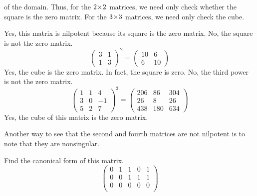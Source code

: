 \begin{exercises}
\begin{answer}
      of the domain.
      Thus, for the $2 \! \times \! 2$ matrices, 
      we need only check whether the square is the zero matrix.
      For the $3 \! \times \! 3$ matrices, we need only check the cube.
      \begin{exparts}
        \partsitem Yes, this matrix is nilpotent because
          its square is the zero matrix.
        \partsitem No, the square is not the zero matrix.
          \begin{equation*}
            \begin{pmatrix}
               3  &1  \\
               1  &3
            \end{pmatrix}^2
            =\begin{pmatrix}
               10  &6  \\
               6   &10
            \end{pmatrix}
          \end{equation*}
        \partsitem Yes, the cube is the zero matrix.
          In fact, the square is zero.
        \partsitem No, the third power is not the zero matrix.
          \begin{equation*}
            \begin{pmatrix}
              1  &1  &4  \\
              3  &0  &-1 \\
              5  &2  &7
            \end{pmatrix}^3
            =\begin{pmatrix}
              206  &86  &304  \\
               26  &8   &26   \\
              438  &180 &634
            \end{pmatrix}
          \end{equation*}
        \partsitem Yes, the cube of this matrix is the zero matrix.
      \end{exparts}
      Another way to see that the second and fourth matrices are not nilpotent
      is to note that they are nonsingular.
    \end{answer}
  \recommended \item 
    Find the canonical form of this matrix.
    \begin{equation*}
      \begin{pmatrix}
        0  &1  &1  &0  &1  \\
        0  &0  &1  &1  &1  \\
        0  &0  &0  &0  &0  \\

\end{pmatrix}
\end{equation*}
\end{exercises}
